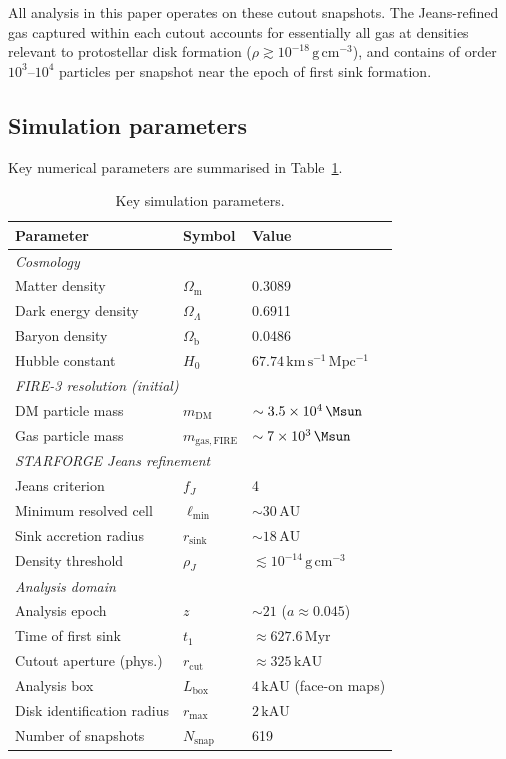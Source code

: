 All analysis in this paper operates on these cutout snapshots.  The
Jeans-refined gas captured within each cutout accounts for essentially all
gas at densities relevant to protostellar disk formation
($\rho\gtrsim10^{-18}\,\mathrm{g\,cm^{-3}}$), and contains of order
$10^3$--$10^4$ particles per snapshot near the epoch of first sink
formation.

\subsection{Simulation parameters}
\label{sec:params}

Key numerical parameters are summarised in Table~\ref{tab:params}.

\begin{table}[h]
\centering
\caption{Key simulation parameters.}
\label{tab:params}
\begin{tabular}{lll}
\hline\hline
Parameter & Symbol & Value \\
\hline
\multicolumn{3}{l}{\textit{Cosmology}} \\
Matter density & $\Omega_\mathrm{m}$ & 0.3089 \\
Dark energy density & $\Omega_\Lambda$ & 0.6911 \\
Baryon density & $\Omega_\mathrm{b}$ & 0.0486 \\
Hubble constant & $H_0$ & $67.74\,\mathrm{km\,s^{-1}\,Mpc^{-1}}$ \\
\hline
\multicolumn{3}{l}{\textit{FIRE-3 resolution (initial)}} \\
DM particle mass & $m_\mathrm{DM}$ & $\sim 3.5\times10^4\,\Msun$ \\
Gas particle mass & $m_\mathrm{gas,FIRE}$ & $\sim 7\times10^3\,\Msun$ \\
\hline
\multicolumn{3}{l}{\textit{STARFORGE Jeans refinement}} \\
Jeans criterion & $f_J$ & 4 \\
Minimum resolved cell & $\ell_\mathrm{min}$ & $\sim 30\,\mathrm{AU}$ \\
Sink accretion radius & $r_\mathrm{sink}$ & $\sim 18\,\mathrm{AU}$ \\
Density threshold & $\rho_J$ & $\lesssim 10^{-14}\,\mathrm{g\,cm}^{-3}$ \\
\hline
\multicolumn{3}{l}{\textit{Analysis domain}} \\
Analysis epoch & $z$ & $\sim 21$ ($a\approx 0.045$) \\
Time of first sink & $t_1$ & $\approx 627.6\,\mathrm{Myr}$ \\
Cutout aperture (phys.) & $r_\mathrm{cut}$ & $\approx 325\,\mathrm{kAU}$ \\
Analysis box & $L_\mathrm{box}$ & $4\,\mathrm{kAU}$ (face-on maps) \\
Disk identification radius & $r_\mathrm{max}$ & $2\,\mathrm{kAU}$ \\
Number of snapshots & $N_\mathrm{snap}$ & 619 \\
\hline\hline
\end{tabular}
\end{table}
